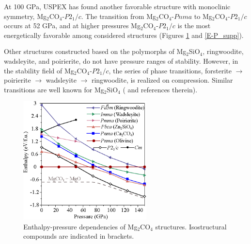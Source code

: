 \documentclass[a4paperm]{article}
\begin{document}
At 100 GPa, USPEX has found another favorable structure with monoclinic symmetry, Mg$_2$CO$_4$-$P2_1/c$.
The transition from Mg$_2$CO$_4$-$Pnma$ to Mg$_2$CO$_4$-$P2_1/c$ occurs at 52 GPa, and at higher pressures Mg$_2$CO$_4$-$P2_1/c$ is the most energetically favorable among considered structures (Figures \ref{E-P} and \ref{E-P_supp}). 

{\color{blue}
Other structures constructed based on the polymorphs of Mg$_2$SiO$_4$, ringwoodite, wadsleyite, and poirierite, do not have pressure ranges of stability.
However, in the stability field of Mg$_2$CO$_4$-$P2_1/c$, the series of phase transitions, forsterite $\to$ poirierite $\to$ wadsleyite $\to$ ringwoodite, is realized on compression.
Similar transitions are well known for Mg$_2$SiO$_4$ (\cite{dorogokupets2015} and references therein).
}


\begin{figure}[H]
	\includegraphics[width=0.6\textwidth]{E-P_mg2co4} \centering
	\caption{Enthalpy-pressure dependencies of Mg$_2$CO$_4$ structures. Isostructural compounds are indicated in brackets.
} \label{E-P}
\end{figure} 
\end{document}
